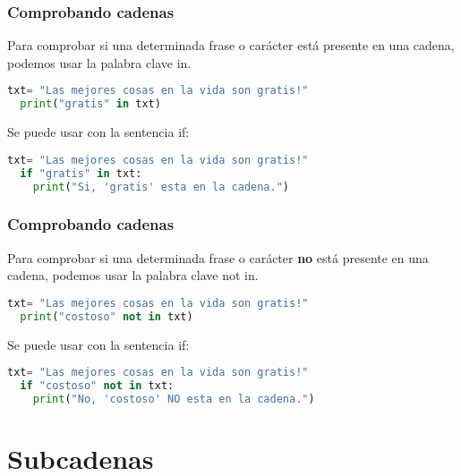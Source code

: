 \begin{frame}[fragile]
  \frametitle{Comprobando cadenas}

  Para comprobar si una determinada frase o carácter está presente
  en una cadena, podemos usar la palabra clave
  \textcolor{codeKeyword}{in}.

  \begin{lstlisting}[language=Python]
  txt= "Las mejores cosas en la vida son gratis!"
  print("gratis" in txt)
  \end{lstlisting}

  \pausa
  Se puede usar con la sentencia \textcolor{codeKeyword}{if}:

  \begin{lstlisting}[language=Python]
  txt= "Las mejores cosas en la vida son gratis!"
  if "gratis" in txt:
    print("Si, 'gratis' esta en la cadena.")
  \end{lstlisting}
\end{frame}

\begin{frame}[fragile]
  \frametitle{Comprobando cadenas}

  Para comprobar si una determinada frase o carácter \textbf{no}
  está presente en una cadena, podemos usar la palabra clave
  \textcolor{codeKeyword}{not in}.

  \begin{lstlisting}[language=Python]
  txt= "Las mejores cosas en la vida son gratis!"
  print("costoso" not in txt)
  \end{lstlisting}

  \pausa
  Se puede usar con la sentencia \textcolor{codeKeyword}{if}:

  \begin{lstlisting}[language=Python]
  txt= "Las mejores cosas en la vida son gratis!"
  if "costoso" not in txt:
    print("No, 'costoso' NO esta en la cadena.")
  \end{lstlisting}
\end{frame}


\section{Subcadenas}


